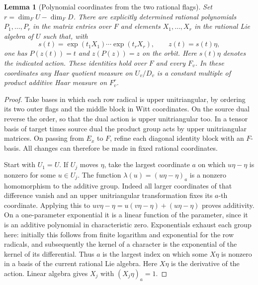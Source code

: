 \documentclass[a4paper,11pt]{article}
\newtheorem{lemma}[proposition]{Lemma}
\theoremstyle{definition}
\theoremstyle{remark}
\numberwithin{equation}{section}
\begin{document}
\begin{lemma}[Polynomial coordinates from the two rational flags]
\leavevmode\label{lem:orbitcoordinates606}
Set \(r=\dim_F U-\dim_F D\). There are explicitly determined
rational polynomials \(P_1,\ldots,P_r\) in the matrix entries
over \(F\) and elements \(X_1,\ldots,X_r\) in the rational
Lie algebra of \(U\) such that, with
\[
 s(t)=\exp(t_1X_1)\cdots\exp(t_rX_r),\qquad z(t)=s(t)\eta ,
\]
one has \(P(z(t))=t\) and \(z(P(z))=z\) on the orbit.
Here \(s(t)\eta\) denotes the indicated action. These
identities hold over \(F\) and every \(F_v\).
In these coordinates any Haar quotient measure on \(U_v/D_v\)
is a constant multiple of product additive Haar measure on
\(F_v^r\).
\end{lemma}
\begin{proof}
Take bases in which each row radical is upper unitriangular,
by ordering its two outer flags and the middle block in Witt
coordinates. On the source dual reverse the order, so that
the dual action is upper unitriangular too. In a tensor basis
of target times source dual the product group acts by upper
unitriangular matrices. On passing from \(E_x\) to \(F\),
refine each diagonal identity block with an \(F\)-basis. All
changes can therefore be made in fixed rational coordinates.

Start with \(U_1=U\). If \(U_j\) moves \(\eta\), take the
largest coordinate \(a\) on which \(u\eta-\eta\) is nonzero
for some \(u\in U_j\). The function
\(\lambda(u)=(u\eta-\eta)_a\) is a nonzero homomorphism to
the additive group. Indeed all larger coordinates of that
difference vanish and an upper unitriangular transformation
fixes its \(a\)-th coordinate. Applying this to
\(uv\eta-\eta=u(v\eta-\eta)+(u\eta-\eta)\) proves additivity.
On a one-parameter exponential it is a linear function of
the parameter, since it is an additive polynomial in
characteristic zero. Exponentials exhaust each group here:
initially this follows from finite logarithm and exponential
for the row radicals, and subsequently the kernel of a
character is the exponential of the kernel of its differential.
Thus \(a\) is the largest index on which some \(X\eta\)
is nonzero in a basis of the current rational Lie algebra.
Here \(X\eta\) is the derivative of the action. Linear
algebra gives \(X_j\) with \((X_j\eta)_a=1\).


\end{proof}
\end{document}

